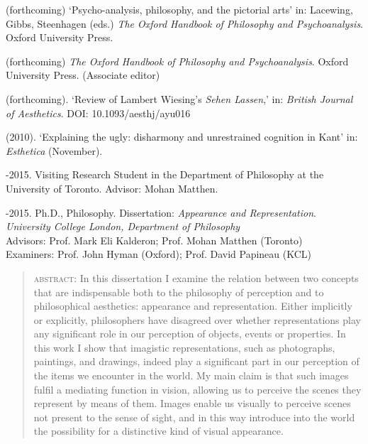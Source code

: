 \documentclass[12pt]{article}
\begin{document}
\medskip
% 
\ind (forthcoming) `Psycho-analysis, philosophy, and the pictorial arts' in: Lacewing, Gibbs, Steenhagen (eds.) \emph{The Oxford Handbook of Philosophy and Psychoanalysis}. Oxford University Press.

\ind (forthcoming) \emph{The Oxford Handbook of Philosophy and Psychoanalysis}. Oxford University Press. (Associate editor)

\ind  (forthcoming). `Review of Lambert Wiesing's \emph{Sehen Lassen},' in: \emph{British Journal of Aesthetics}. DOI: 10.1093/aesthj/ayu016 

\ind  (2010). `Explaining the ugly: disharmony and unrestrained cognition in Kant' in: \emph{Esthetica} (November).

\bigskip
{}


-2015. Visiting Research Student in the Department of Philosophy at the University of Toronto. Advisor: Mohan Matthen.

-2015. Ph.D., Philosophy. Dissertation:
\emph{Appearance and Representation}. 
\emph{University College London, Department of  Philosophy \vspace{0.01in}}\\ Advisors: Prof. Mark Eli Kalderon; Prof. Mohan Matthen (Toronto)\\
Examiners: Prof. John Hyman (Oxford); Prof. David Papineau (KCL) 
\vspace{-0.1in}

\begin{quote}
	\textsc{abstract:} In this dissertation I examine the relation between two concepts that are indispensable both to the philosophy of perception and to philosophical aesthetics: appearance and representation. Either implicitly or explicitly, philosophers have disagreed over whether representations play any significant role in our perception of objects, events or properties. In this work I show that imagistic representations, such as photographs, paintings, and drawings, indeed play a significant part in our perception of the items we encounter in the world. My main claim is that such images fulfil a mediating function in vision, allowing us to perceive the scenes they represent by means of them. Images enable us visually to perceive scenes not present to the sense of sight, and in this way introduce into the world the possibility for a distinctive kind of visual appearance.
\end{quote}
\end{document}
